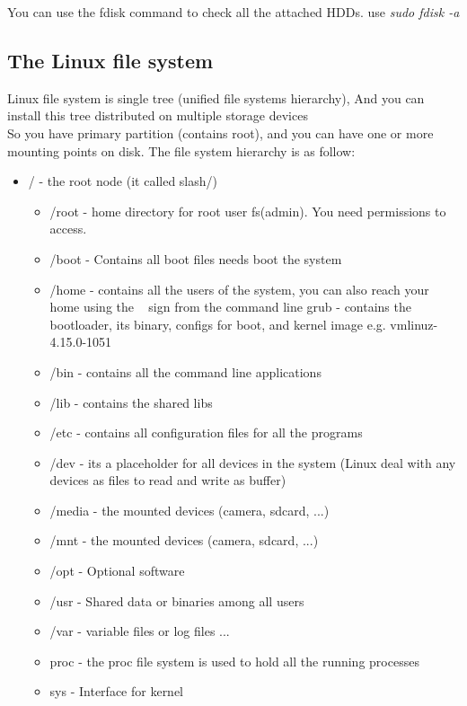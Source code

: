 \documentclass{article}
\begin{document}
You can use the fdisk command to check all the attached HDDs. use \textit{sudo fdisk -a}

\subsection{The Linux file system}
Linux file system is single tree (unified file systems hierarchy), And you can install this tree distributed on multiple storage devices\\
So you have primary partition (contains root), and you can have one or more mounting points on disk.
The file system hierarchy is as follow:
\begin{itemize}
    \item / - the root node (it called slash/)
    \begin{itemize}
        \item /root - home directory for root user fs(admin). You need permissions to access.
        \item /boot - Contains all boot files needs boot the system 
        \item /home - contains all the users of the system, you can also reach your home using the ~ sign from the command line
         grub - contains the bootloader, its binary, configs for boot, and kernel image e.g. vmlinuz-4.15.0-1051
        \item /bin - contains all the command line applications
        \item /lib - contains the shared libs
        \item /etc - contains all configuration files for all the programs
        \item /dev   - its a placeholder for all devices in the system (Linux deal with any devices as files to read and write as buffer)
        \item /media - the mounted devices (camera, sdcard, ...)
        \item /mnt  - the mounted devices (camera, sdcard, ...)
        \item /opt  - Optional software
        \item /usr  - Shared data or binaries among all users
        \item /var  - variable files or log files ...
        \item proc  - the proc file system is used to hold all the running processes 
        \item sys   - Interface for kernel 
    \end{itemize}      
\end{itemize}
\end{document}
